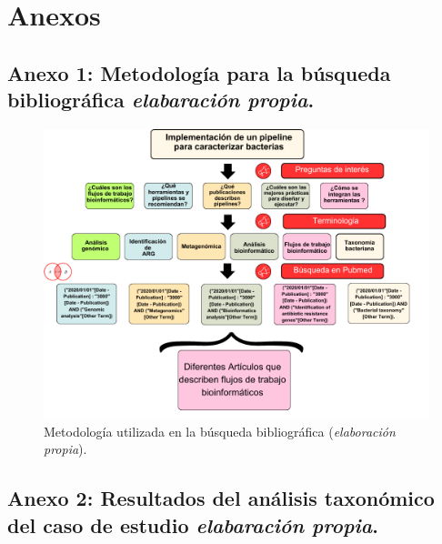 \documentclass[12pt]{article}
\begin{document}
\newpage

\clearpage 
\section{Anexos}
\subsection{Anexo 1: Metodología para la búsqueda bibliográfica \emph{elabaración propia}.}

\begin{figure}[ht!]
    \centering
    \small
    \includegraphics[scale=0.35]{anexo1.png}
    \caption{Metodología utilizada en la búsqueda bibliográfica (\emph{elaboración propia}).} 
    \label{fig:metodologiaBiblio}
\end{figure}

\newpage
\subsection{Anexo 2: Resultados del análisis taxonómico del caso de estudio \emph{elabaración propia}.}
\end{document}
